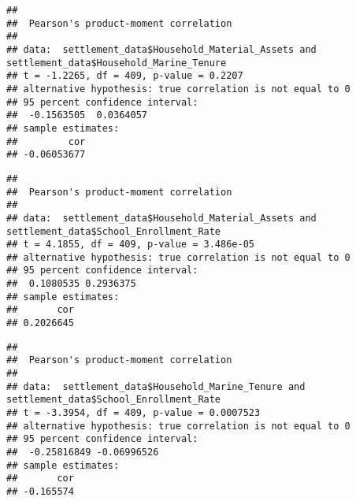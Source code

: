 \documentclass[
]{article}
\newenvironment{Shaded}{\begin{snugshade}}{\end{snugshade}}
\newcommand{\AttributeTok}[1]{\textcolor[rgb]{0.13,0.29,0.53}{#1}}
\newcommand{\CommentTok}[1]{\textcolor[rgb]{0.56,0.35,0.01}{\textit{#1}}}
\newcommand{\FunctionTok}[1]{\textcolor[rgb]{0.13,0.29,0.53}{\textbf{#1}}}
\newcommand{\NormalTok}[1]{#1}
\newcommand{\SpecialCharTok}[1]{\textcolor[rgb]{0.81,0.36,0.00}{\textbf{#1}}}
\newcommand{\StringTok}[1]{\textcolor[rgb]{0.31,0.60,0.02}{#1}}
\begin{document}
\begin{verbatim}
## 
##  Pearson's product-moment correlation
## 
## data:  settlement_data$Household_Material_Assets and settlement_data$Household_Marine_Tenure
## t = -1.2265, df = 409, p-value = 0.2207
## alternative hypothesis: true correlation is not equal to 0
## 95 percent confidence interval:
##  -0.1563505  0.0364057
## sample estimates:
##         cor 
## -0.06053677
\end{verbatim}

\begin{Shaded}
\end{Shaded}

\begin{verbatim}
## 
##  Pearson's product-moment correlation
## 
## data:  settlement_data$Household_Material_Assets and settlement_data$School_Enrollment_Rate
## t = 4.1855, df = 409, p-value = 3.486e-05
## alternative hypothesis: true correlation is not equal to 0
## 95 percent confidence interval:
##  0.1080535 0.2936375
## sample estimates:
##       cor 
## 0.2026645
\end{verbatim}

\begin{Shaded}
\end{Shaded}

\begin{verbatim}
## 
##  Pearson's product-moment correlation
## 
## data:  settlement_data$Household_Marine_Tenure and settlement_data$School_Enrollment_Rate
## t = -3.3954, df = 409, p-value = 0.0007523
## alternative hypothesis: true correlation is not equal to 0
## 95 percent confidence interval:
##  -0.25816849 -0.06996526
## sample estimates:
##       cor 
## -0.165574
\end{verbatim}
\end{document}
